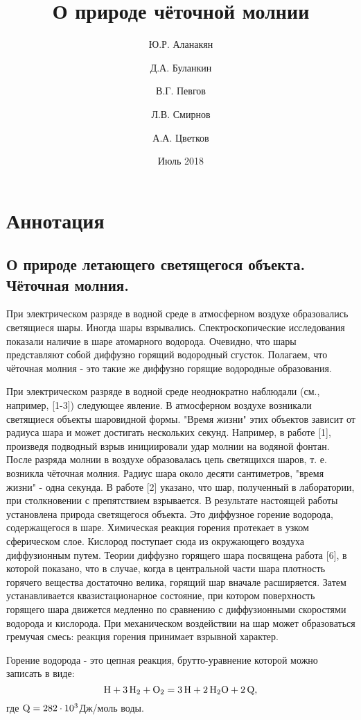 \documentclass[a4paper]{article}
\title{О природе чёточной молнии}
\author{Ю.Р. Аланакян\\ \and Д.А. Буланкин\\ \and В.Г. Певгов\\ \and Л.В. Смирнов\\ \and А.А. Цветков\\}
\date{Июль 2018}
\begin{document}
\maketitle
\newpage

\section{Аннотация}
\subsection{О природе летающего светящегося объекта. Чёточная молния.}

При электрическом разряде в водной среде в атмосферном воздухе образовались светящиеся шары. Иногда шары взрывались. Спектроскопические исследования показали наличие в шаре атомарного водорода. Очевидно, что шары представляют собой диффузно горящий водородный сгусток. Полагаем, что чёточная молния - это такие же диффузно горящие водородные образования.

При электрическом разряде в водной среде неоднократно наблюдали (см., например, [1-3]) следующее явление. В атмосферном воздухе возникали светящиеся объекты шаровидной формы. "Время жизни" этих объектов зависит от радиуса шара и может достигать нескольких секунд. Например, в работе [1], произведя подводный взрыв инициировали удар молнии на водяной фонтан. После разряда молнии в воздухе образовалась цепь светящихся шаров, т. е. возникла чёточная молния. Радиус шара около десяти сантиметров, "время жизни" - одна секунда. В работе [2] указано, что шар, полученный в лаборатории, при столкновении с препятствием взрывается. В результате настоящей работы установлена природа светящегося объекта. Это диффузное горение водорода, содержащегося в шаре. Химическая реакция горения протекает в узком сферическом слое. Кислород поступает сюда из окружающего воздуха диффузионным путем. Теории диффузно горящего шара посвящена работа [6], в которой показано, что в случае, когда в центральной части шара плотность горячего вещества достаточно велика, горящий шар вначале расширяется. Затем устанавливается квазистационарное состояние, при котором поверхность горящего шара движется медленно по сравнению с диффузионными скоростями водорода и кислорода. При механическом воздействии на шар может образоваться гремучая смесь: реакция горения принимает взрывной характер.

\newpage
Горение водорода - это цепная реакция, брутто-уравнение которой можно записать в виде:
\begin{equation} \label{eq:1}
\ce{H} + \ce{3H2} + \ce{O2} = \ce{3H} + \ce{2H2O} + \ce{2Q},    
\end{equation}
где \(\ce{Q} = 282\cdot10^3\)Дж/моль воды.
\end{document}
